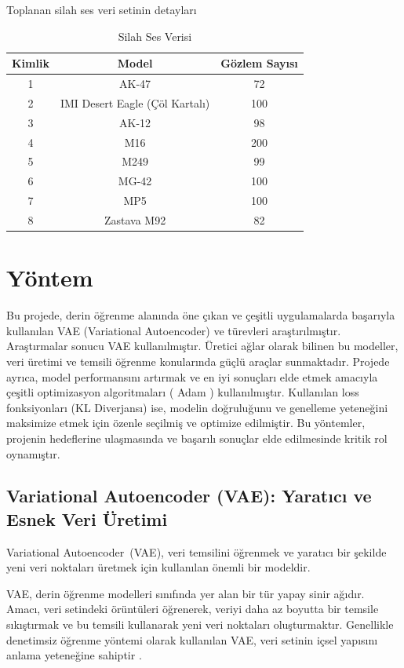 \documentclass[12pt, a4paper]{article}
\begin{document}
	Toplanan silah ses veri setinin detayları
	
	\begin{table}[ht!]
		\caption{Silah Ses Verisi}
		\raggedright
		\label{tablo:silah_ses_verisi}
		\centering
		\begin{tabular}{|c|c|c|}
			\hline
			\textbf{Kimlik} & \textbf{Model} & \textbf{Gözlem Sayısı} \\
			\hline
			1 & AK-47 & 72 \\
			\hline
			2 & IMI Desert Eagle (Çöl Kartalı) & 100 \\
			\hline
			3 & AK-12 & 98 \\
			\hline
			4 & M16 & 200 \\
			\hline
			5 & M249 & 99 \\
			\hline
			6 & MG-42 & 100 \\
			\hline
			7 & MP5 & 100 \\
			\hline
			8 & Zastava M92 & 82 \\
			\hline
		\end{tabular}
	\end{table}


	\section{Yöntem}
		Bu projede, derin öğrenme alanında öne çıkan ve çeşitli uygulamalarda başarıyla kullanılan VAE (Variational Autoencoder) ve türevleri araştırılmıştır. Araştırmalar sonucu VAE kullanılmıştır. Üretici ağlar olarak bilinen bu modeller, veri üretimi ve temsili öğrenme konularında güçlü araçlar sunmaktadır. Projede ayrıca, model performansını artırmak ve en iyi sonuçları elde etmek amacıyla çeşitli optimizasyon algoritmaları ( Adam ) kullanılmıştır. Kullanılan loss fonksiyonları (KL Diverjansı) ise, modelin doğruluğunu ve genelleme yeteneğini maksimize etmek için özenle seçilmiş ve optimize edilmiştir. Bu yöntemler, projenin hedeflerine ulaşmasında ve başarılı sonuçlar elde edilmesinde kritik rol oynamıştır.
			\vspace*{1\baselineskip}
			\subsection{Variational Autoencoder (VAE): Yaratıcı ve Esnek Veri Üretimi}
			Variational Autoencoder (VAE), veri temsilini öğrenmek ve yaratıcı bir şekilde yeni veri noktaları üretmek için kullanılan önemli bir modeldir.
			
			VAE, derin öğrenme modelleri sınıfında yer alan bir tür yapay sinir ağıdır. Amacı, veri setindeki örüntüleri öğrenerek, veriyi daha az boyutta bir temsile sıkıştırmak ve bu temsili kullanarak yeni veri noktaları oluşturmaktır. Genellikle denetimsiz öğrenme yöntemi olarak kullanılan VAE, veri setinin içsel yapısını anlama yeteneğine sahiptir \cite{VAE}.
			
\end{document}
